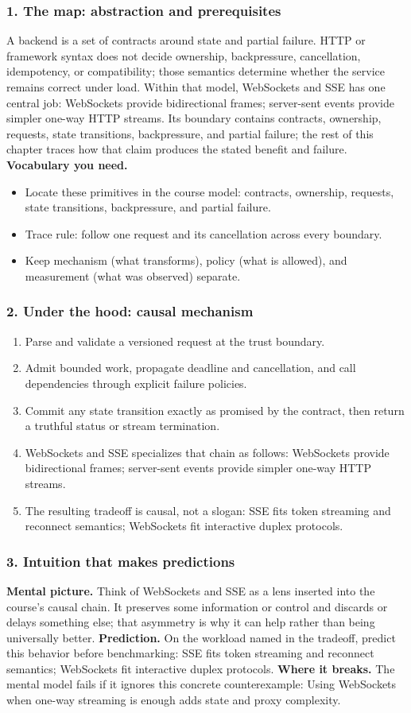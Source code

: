 \subsubsection*{1. The map: abstraction and prerequisites}
A backend is a set of contracts around state and partial failure. HTTP or framework syntax does not decide ownership, backpressure, cancellation, idempotency, or compatibility; those semantics determine whether the service remains correct under load.
Within that model, WebSockets and SSE has one central job: WebSockets provide bidirectional frames; server-sent events provide simpler one-way HTTP streams. Its boundary contains contracts, ownership, requests, state transitions, backpressure, and partial failure; the rest of this chapter traces how that claim produces the stated benefit and failure.
\textbf{Vocabulary you need.}\begin{itemize}
\item Locate these primitives in the course model: contracts, ownership, requests, state transitions, backpressure, and partial failure.
\item Trace rule: follow one request and its cancellation across every boundary.
\item Keep mechanism (what transforms), policy (what is allowed), and measurement (what was observed) separate.
\end{itemize}
\subsubsection*{2. Under the hood: causal mechanism}\begin{enumerate}
\item Parse and validate a versioned request at the trust boundary.
\item Admit bounded work, propagate deadline and cancellation, and call dependencies through explicit failure policies.
\item Commit any state transition exactly as promised by the contract, then return a truthful status or stream termination.
\item WebSockets and SSE specializes that chain as follows: WebSockets provide bidirectional frames; server-sent events provide simpler one-way HTTP streams.
\item The resulting tradeoff is causal, not a slogan: SSE fits token streaming and reconnect semantics; WebSockets fit interactive duplex protocols.
\end{enumerate}
\subsubsection*{3. Intuition that makes predictions}
\textbf{Mental picture.} Think of WebSockets and SSE as a lens inserted into the course's causal chain. It preserves some information or control and discards or delays something else; that asymmetry is why it can help rather than being universally better.
\textbf{Prediction.} On the workload named in the tradeoff, predict this behavior before benchmarking: SSE fits token streaming and reconnect semantics; WebSockets fit interactive duplex protocols.
\textbf{Where it breaks.} The mental model fails if it ignores this concrete counterexample: Using WebSockets when one-way streaming is enough adds state and proxy complexity.
